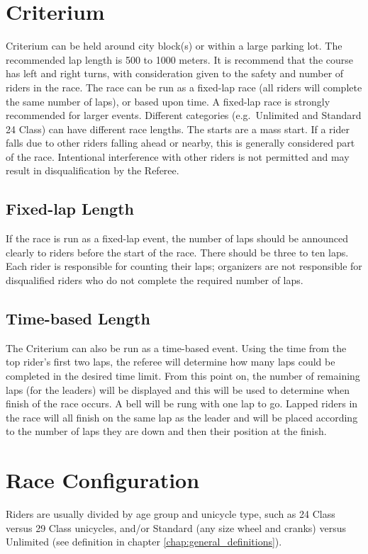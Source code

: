 \section{Criterium}
Criterium can be held around city block(s) or within a large parking lot.
The recommended lap length is 500 to 1000 meters.
It is recommend that the course has left and right turns, with consideration given to the safety and number of riders in the race.
The race can be run as a fixed-lap race (all riders will complete the same number of laps), or based upon time.
A fixed-lap race is strongly recommended for larger events.
Different categories (e.g.\ Unlimited and Standard 24 Class) can have different race lengths.
The starts are a mass start.
If a rider falls due to other riders falling ahead or nearby, this is generally considered part of the race.
Intentional interference with other riders is not permitted and may result in disqualification by the Referee.

\subsection{Fixed-lap Length}
If the race is run as a fixed-lap event, the number of laps should be announced clearly to riders before the start of the race.
There should be three to ten laps.
Each rider is responsible for counting their laps; organizers are not responsible for disqualified riders who do not complete the required number of laps.

\subsection{Time-based Length}
The Criterium can also be run as a time-based event.
Using the time from the top rider’s first two laps, the referee will determine how many laps could be completed in the desired time limit.
From this point on, the number of remaining laps (for the leaders) will be displayed and this will be used to determine when finish of the race occurs.
A bell will be rung with one lap to go.
Lapped riders in the race will all finish on the same lap as the leader and will be placed according to the number of laps they are down and then their position at the finish.

\section{Race Configuration}

Riders are usually divided by age group and unicycle type, such as 24 Class versus 29 Class unicycles, and/or Standard (any size wheel and cranks) versus Unlimited (see definition in chapter \ref{chap:general_definitions}).

